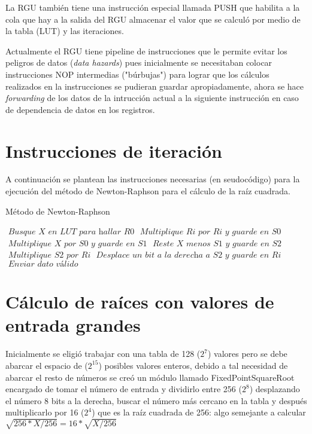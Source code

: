 La RGU también tiene una instrucción especial llamada PUSH que  habilita a la cola que hay a la salida del RGU almacenar el valor que se calculó por medio de la tabla (LUT) y las iteraciones.

Actualmente el RGU tiene pipeline de instrucciones que le permite evitar los peligros de datos (\textit{data hazards}) pues  inicialmente se necesitaban colocar instrucciones NOP intermedias ("búrbujas") para lograr que los cálculos realizados en la instrucciones se pudieran guardar apropiadamente, ahora se hace \textit{forwarding} de los datos de la intrucción actual a la siguiente instrucción en caso de dependencia de datos en los registros.

\section{Instrucciones de iteración}

A continuación se plantean las instrucciones necesarias (en seudocódigo) para la ejecución del método de Newton-Raphson para el cálculo de la raíz cuadrada. 

\begin{algorithm}
\caption{Método de Newton-Raphson}\label{ray}
\begin{algorithmic}[1]
\State $\textit{ Busque X en LUT para hallar R0}$
\State $\textit{ Multiplique Ri por Ri y guarde en S0}$
\State $\textit{ Multiplique X por S0 y guarde en S1}$
\State $\textit{ Reste X menos S1 y guarde en S2}$
\State $\textit{ Multiplique S2 por Ri}$
\State $\textit{ Desplace un bit a la derecha a S2 y guarde en Ri}$
\EndFor
\State $\textit{ Enviar dato válido}$
\EndProcedure
\end{algorithmic}
\end{algorithm}

\section{Cálculo de raíces con valores de entrada grandes}

Inicialmente se eligió trabajar con una tabla de 128 ($2^7$) valores pero se debe abarcar el espacio de ($2^15$) posibles valores enteros, debido a tal necesidad de abarcar el resto de números se creó un módulo llamado FixedPointSquareRoot encargado de tomar el número de entrada y dividirlo entre 256 ($2^8$) desplazando el número 8 bits a la derecha, buscar el número más cercano en la tabla y después multiplicarlo por 16 ($2^4$) que es la raíz cuadrada de 256: algo semejante a calcular $\sqrt{256*X/256}=16*\sqrt{X/256}$ 

